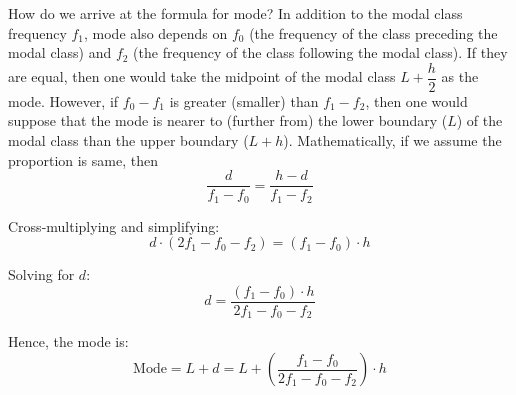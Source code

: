 \documentclass[twoside]{book}
\begin{document}
\begin{enumerate}
How do we arrive at the formula for mode? In addition to the modal class frequency $f_1$, mode also depends on $f_0$ (the frequency of the class preceding the modal class) and $f_2$ (the frequency of the class following the modal class). If they are equal, then one would take the midpoint of the modal class $L+ \dfrac{h}{2}$ as the mode. However, if $f_0-f_1$ is greater (smaller) than $f_1-f_2$, then one would suppose that the mode is nearer to (further from) the lower boundary ($L$) of the modal class than the upper boundary ($L+h$). Mathematically, if we assume the proportion is same, then
\[
\frac{d}{f_1 - f_0} = \frac{h - d}{f_1 - f_2}
\]

Cross-multiplying and simplifying:
\[
d\cdot (2f_1 - f_0 - f_2) = (f_1 - f_0)\cdot h
\]

Solving for \( d \):
\[
d = \frac{(f_1 - f_0)\cdot h}{2f_1 - f_0 - f_2}
\]

Hence, the mode is:
\[
\text{Mode} = L + d = L + \left( \frac{f_1 - f_0}{2f_1 - f_0 - f_2} \right) \cdot h
\]

\begin{center}
\end{center}
\end{enumerate}
\end{document}
